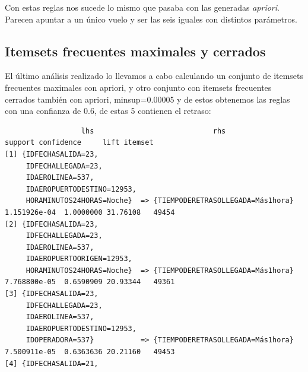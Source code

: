 \documentclass{article}
\begin{document}
Con estas reglas nos sucede lo mismo que pasaba con las generadas \textit{apriori}. Parecen apuntar a un único vuelo y ser las seis iguales con distintos parámetros. 


\subsection{Itemsets frecuentes maximales y cerrados}

El último análisis realizado lo llevamos a cabo calculando un conjunto de itemsets frecuentes maximales con apriori, y otro conjunto con itemsets frecuentes cerrados también con apriori, minsup=0.00005 y de estos obtenemos las reglas con una confianza de 0.6, de estas 5 contienen el retraso:
\begin{lstlisting}
                  lhs                            rhs                                    support confidence     lift itemset
[1] {IDFECHASALIDA=23,                                                                                       
     IDFECHALLEGADA=23,                                                                                      
     IDAEROLINEA=537,                                                                                        
     IDAEROPUERTODESTINO=12953,                                                                              
     HORAMINUTOS24HORAS=Noche}  => {TIEMPODERETRASOLLEGADA=Más1hora} 1.151926e-04  1.0000000 31.76108   49454
[2] {IDFECHASALIDA=23,                                                                                       
     IDFECHALLEGADA=23,                                                                                      
     IDAEROLINEA=537,                                                                                        
     IDAEROPUERTOORIGEN=12953,                                                                               
     HORAMINUTOS24HORAS=Noche}  => {TIEMPODERETRASOLLEGADA=Más1hora} 7.768800e-05  0.6590909 20.93344   49361
[3] {IDFECHASALIDA=23,                                                                                       
     IDFECHALLEGADA=23,                                                                                      
     IDAEROLINEA=537,                                                                                        
     IDAEROPUERTODESTINO=12953,                                                                              
     IDOPERADORA=537}           => {TIEMPODERETRASOLLEGADA=Más1hora} 7.500911e-05  0.6363636 20.21160   49453
[4] {IDFECHASALIDA=21,                                                                                       

\end{lstlisting}
\end{document}
